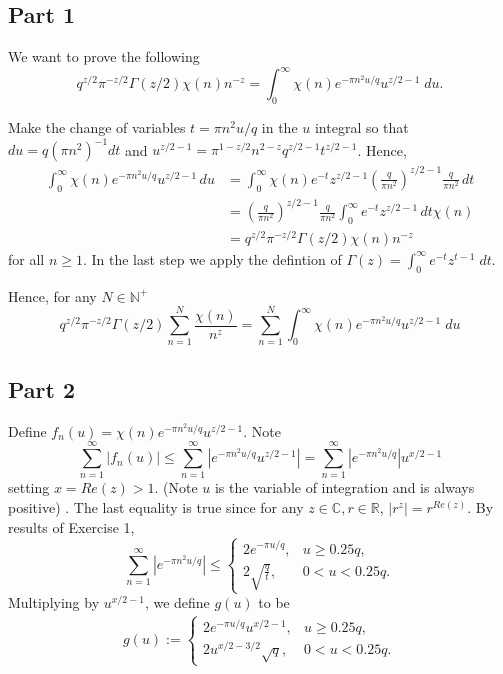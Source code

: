 \documentclass{article}
\theoremstyle{definition}
\theoremstyle{definition}
\theoremstyle{remark}
\newcommand{\x}{\chi}
\newcommand{\bb}[1]{\mathbb{#1}} %
\begin{document}
\subsection*{Part 1}
We want to prove the following
\begin{equation*}
    q^{z/2}\pi^{-z/2}\Gamma(z/2) \chi(n)n^{-z} = \int_{0}^{\infty} \chi(n)e^{-\pi n^2 u/q} u^{z/2-1} \;du.
\end{equation*}

Make the change of variables $t = \pi n^2 u / q$ in the $u$ integral so that $du = q (\pi n^2)^{-1} dt$ and $u^{z/2 - 1} = \pi^{1-z/2}n^{2-z}q^{z/2 -1}t^{z/2 - 1}$.
Hence,
\begin{align}
    \int_0^{\infty} \x(n)e^{-\pi n^2 u / q} u^{z/2 - 1} \,du 
	&= \int_0^{\infty} \x(n)e^{-t} z^{z/2 - 1} \left( \frac{q}{\pi n^2}\right)^{z/2 -1} \frac{q}{\pi n^2}\,dt  \\
	&= \left( \frac{q}{\pi n^2}\right)^{z/2 -1} \frac{q}{\pi n^2} \int_0^{\infty} e^{-t} z^{z/2 - 1}  \,dt  \x(n) \\
	&= q^{z/2}\pi^{-z/2}\Gamma(z/2) \chi(n)n^{-z}
\end{align}
for all $n \geq 1$. 
In the last step we apply the defintion of $\Gamma(z) = \int_0^{\infty}e^{-t}z^{t-1} \;dt$.

Hence, for any $N \in \mathbb{N}^+$
\begin{equation*}
	q^{z/2}\pi^{-z/2}\Gamma(z/2)  \sum_{n=1}^{N} \frac{\x(n)}{n^z} = \sum_{n=1}^{N} \int_{0}^{\infty} \chi(n)e^{-\pi n^2 u/q} u^{z/2-1} \;du
\end{equation*}

\subsection*{Part 2}

Define $f_n(u) = \chi(n)e^{-\pi n^2 u/q} u^{z/2-1}$.
Note
\begin{dmath}
	\sum_{n=1}^{\infty} |f_n(u)| 
	\leq \sum_{n=1}^{\infty} |e^{-\pi n^2 u/q} u^{z/2-1}|  
	= \sum_{n=1}^{\infty} |e^{-\pi n^2 u/q}| u^{x/2-1}
\end{dmath}
setting $x = Re(z) > 1$. (Note $u$ is the variable of integration and is always positive) .
The last equality is true since for any $z \in \bb{C}, r \in \bb{R}$, $|r^z| = r^{Re(z)}$.
By results of Exercise 1, 
\begin{dmath}
	\sum_{n=1}^{\infty} |e^{-\pi n^2 u/q}| \leq
    \begin{cases}
        2e^{-\pi u / q} , & u \geq 0.25 q, \\
		2\sqrt{\frac{q}{t}}, & 0 < u < 0.25 q.
    \end{cases}
\end{dmath}
Multiplying by $u^{x/2 - 1}$, we define $g(u)$ to be
\begin{align}
	g(u) :=
    \begin{cases}
		2e^{-\pi u / q} u^{x/2 - 1} , & u \geq 0.25 q, \\
		2 u^{x/2 - 3/2}\sqrt{q}, & 0 < u < 0.25 q.
    \end{cases}
\end{align}
\end{document}
